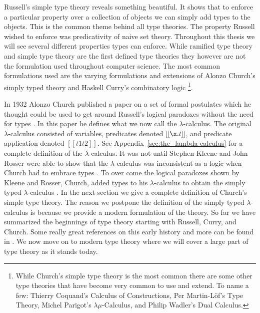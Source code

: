 Russell's simple type theory reveals something beautiful.  It shows
that to enforce a particular property over a collection of objects we
can simply add types to the objects.  This is the common theme behind
all type theories.  The property Russell wished to enforce was
predicativity of naive set theory.  Throughout this thesis we will see
several different properties types can enforce.  While ramified type
theory and simple type theory are the first defined type theories they
however are not the formulation used throughout computer science.  The
most common formulations used are the varying formulations and
extensions of Alonzo Church's simply typed theory and Haskell Curry's
combinatory logic \cite{Church:1940,Cardone:2006} 
\footnote{While Church's simple type theory is the most common there
  are some other type theories that have become very common to use and
  extend.  To name a few: Thierry Coquand's Calculus of Constructions,
  Per Martin-L\"of's Type Theory, Michel Parigot's
  $\lambda\mu$-Calculus, and Philip Wadler's Dual Calculus.}.  

In 1932 Alonzo Church published a paper on a set of formal postulates
which he thought could be used to get around Russell's logical
paradoxes without the need for types \cite{Church:1933}.  In this
paper he defines what we now call the $\lambda$-calculus.  The
original $\lambda$-calculus consisted of variables, predicates denoted
$[[\x.t]]$, and predicate application denoted $[[t1 t2]]$.  See
Appendix~\ref{sec:the_lambda-calculus} for a complete definition of
the $\lambda$-calculus.  It was not until Stephen Kleene and John Rosser were
able to show that the $\lambda$-calculus was inconsistent as a logic
when Church had to embrace types \cite{Kleene:1935}.  To over come the
logical paradoxes shown by Kleene and Rosser, Church, added types to
his $\lambda$-calculus to obtain the simply typed $\lambda$-calculus
\cite{Church:1940,Andrews:2009}.  In the next section we give a
complete definition of Church's simple type theory.  The reason we
postpone the definition of the simply typed $\lambda$-calculus is
because we provide a modern formulation of the theory.  So far we have
summarized the beginnings of type theory starting with Russell, Curry,
and Church.  Some really great references on this early history and more
can be found in \cite{Cardone:2006,Coquand:2010b,Barendregt:1992}.  We now
move on to modern type theory where we will cover a large part of type
theory as it stands today.


